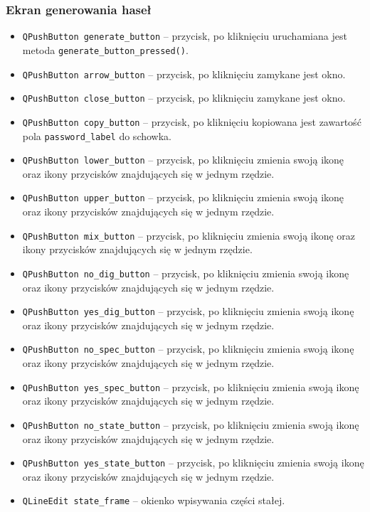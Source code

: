 \documentclass[a4paper]{article}
\newcommand{\prog}{\texttt}
\begin{document}
\subsubsection{Ekran generowania haseł}
\begin{itemize}
    \item \prog{QPushButton generate\_button} -- przycisk, po kliknięciu uruchamiana jest metoda \prog{generate\_button\_pressed()}.
    \item \prog{QPushButton arrow\_button} -- przycisk, po kliknięciu zamykane jest okno.
    \item \prog{QPushButton close\_button} -- przycisk, po kliknięciu zamykane jest okno.
    \item \prog{QPushButton copy\_button} -- przycisk, po kliknięciu kopiowana jest zawartość pola \prog{password\_label} do schowka.
    \item \prog{QPushButton lower\_button} -- przycisk, po kliknięciu zmienia swoją ikonę oraz ikony przycisków znajdujących się w jednym rzędzie.
    \item \prog{QPushButton upper\_button} -- przycisk, po kliknięciu zmienia swoją ikonę oraz ikony przycisków znajdujących się w jednym rzędzie.
    \item \prog{QPushButton mix\_button} -- przycisk, po kliknięciu zmienia swoją ikonę oraz ikony przycisków znajdujących się w jednym rzędzie.
    \item \prog{QPushButton no\_dig\_button} -- przycisk, po kliknięciu zmienia swoją ikonę oraz ikony przycisków znajdujących się w jednym rzędzie.
    \item \prog{QPushButton yes\_dig\_button} -- przycisk, po kliknięciu zmienia swoją ikonę oraz ikony przycisków znajdujących się w jednym rzędzie.
    \item \prog{QPushButton no\_spec\_button} -- przycisk, po kliknięciu zmienia swoją ikonę oraz ikony przycisków znajdujących się w jednym rzędzie.
    \item \prog{QPushButton yes\_spec\_button} -- przycisk, po kliknięciu zmienia swoją ikonę oraz ikony przycisków znajdujących się w jednym rzędzie.
    \item \prog{QPushButton no\_state\_button} -- przycisk, po kliknięciu zmienia swoją ikonę oraz ikony przycisków znajdujących się w jednym rzędzie.
    \item \prog{QPushButton yes\_state\_button} -- przycisk, po kliknięciu zmienia swoją ikonę oraz ikony przycisków znajdujących się w jednym rzędzie.
    \item \prog{QLineEdit state\_frame} -- okienko wpisywania części stałej.
\end{itemize}
\end{document}

